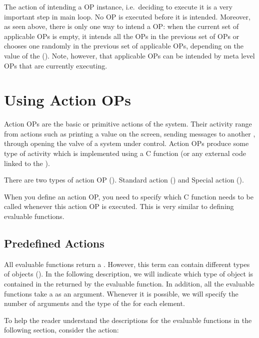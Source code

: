 The action of intending a OP instance, i.e.\ deciding to execute it is a very
important step in \CXPK{} main loop. No OP is executed before it is intended.
Moreover, as seen above, there is only one way to intend a OP: when
the current set of applicable OPs is empty, it intends all the OPs in the
previous set of OPs or chooses one randomly in the previous set of applicable OPs,
depending on the value of the  ().  Note, however, that applicable OPs can be intended by 
meta level OPs that are currently executing.

\section{Using Action OPs}

Action OPs are the basic or primitive actions of the
system. Their activity range from actions such as printing a value on the
screen, sending messages to another \COPRS{}, through opening the valve of a
system under \COPRS{} control. Action OPs produce some type of
activity which is implemented using a C function (or any external code
linked to
the \CPK{}).

There are two types of action OP (). Standard action
() and Special action ().

When you define an action OP, you need to specify which C function needs
to be called whenever this action OP is executed. This is very similar to
defining evaluable functions.



\subsection{Predefined Actions}

All evaluable functions return a . However, this term
can contain different types of objects (). In the following
description, we will indicate which type of object is contained in the
 returned by the evaluable function. In addition, all the
evaluable functions take a  as an argument. Whenever it is
possible, we will specify the number of arguments and the type of the
 for each element.

To help the reader understand the descriptions for the evaluable functions
in the following section, consider the  action:

